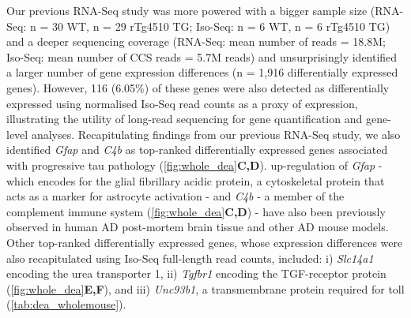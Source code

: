 Our previous RNA-Seq study\cite{Castanho2020} was more powered with a bigger sample size (RNA-Seq: n = 30 WT, n = 29 rTg4510 TG; Iso-Seq: n = 6 WT, n = 6 rTg4510 TG) and a deeper sequencing coverage (RNA-Seq: mean number of reads = 18.8M; Iso-Seq: mean number of CCS reads = 5.7M reads) and unsurprisingly identified a larger number of gene expression differences (n = 1,916 differentially expressed genes). However, 116 (6.05\%) of these genes were also detected as differentially expressed using normalised Iso-Seq read counts as a proxy of expression, illustrating the utility of long-read sequencing for gene quantification and gene-level analyses. Recapitulating findings from our previous RNA-Seq study, we also identified \textit{Gfap} and \textit{C4b} as top-ranked differentially expressed genes associated with progressive tau pathology (\cref{fig:whole_dea}\textbf{C,D}). up-regulation of \textit{Gfap} - which encodes for the glial fibrillary acidic protein, a cytoskeletal protein that acts as a marker for astrocyte activation - and \textit{C4b} - a member of the complement immune system (\cref{fig:whole_dea}\textbf{C,D}) - have also been previously observed in human AD post-mortem brain tissue and other AD mouse models\cite{Muramori1998,Ishiki2016, Chatterjee2021}. Other top-ranked differentially expressed genes, whose expression differences were also recapitulated using Iso-Seq full-length read counts, included: i) \textit{Slc14a1}\cite{Castillo2017} encoding the urea transporter 1, ii) \textit{Tgfbr1} encoding the TGF-\textbeta receptor protein (\cref{fig:whole_dea}\textbf{E,F}), and iii) \textit{Unc93b1}\cite{Wirz2013}, a transmembrane protein required for toll (\cref{tab:dea_wholemouse}).

